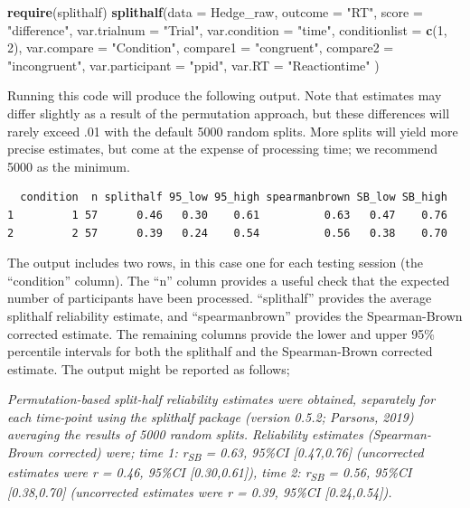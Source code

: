\documentclass[english,,man,floatsintext]{apa6}
\newenvironment{Shaded}{\begin{snugshade}}{\end{snugshade}}
\newcommand{\DataTypeTok}[1]{\textcolor[rgb]{0.13,0.29,0.53}{#1}}
\newcommand{\DecValTok}[1]{\textcolor[rgb]{0.00,0.00,0.81}{#1}}
\newcommand{\KeywordTok}[1]{\textcolor[rgb]{0.13,0.29,0.53}{\textbf{#1}}}
\newcommand{\NormalTok}[1]{#1}
\newcommand{\StringTok}[1]{\textcolor[rgb]{0.31,0.60,0.02}{#1}}
\begin{document}
\begin{Shaded}
\begin{Highlighting}[]
\KeywordTok{require}\NormalTok{(splithalf)}
\KeywordTok{splithalf}\NormalTok{(}\DataTypeTok{data =}\NormalTok{ Hedge_raw,}
          \DataTypeTok{outcome =} \StringTok{"RT"}\NormalTok{,}
          \DataTypeTok{score =} \StringTok{"difference"}\NormalTok{,}
          \DataTypeTok{var.trialnum =} \StringTok{"Trial"}\NormalTok{,}
          \DataTypeTok{var.condition =} \StringTok{"time"}\NormalTok{,}
          \DataTypeTok{conditionlist =} \KeywordTok{c}\NormalTok{(}\DecValTok{1}\NormalTok{, }\DecValTok{2}\NormalTok{),}
          \DataTypeTok{var.compare =} \StringTok{"Condition"}\NormalTok{,}
          \DataTypeTok{compare1 =} \StringTok{"congruent"}\NormalTok{,}
          \DataTypeTok{compare2 =} \StringTok{"incongruent"}\NormalTok{,}
          \DataTypeTok{var.participant =} \StringTok{"ppid"}\NormalTok{,}
          \DataTypeTok{var.RT =} \StringTok{"Reactiontime"}\NormalTok{ )}
\end{Highlighting}
\end{Shaded}

Running this code will produce the following output. Note that estimates may differ slightly as a result of the permutation approach, but these differences will rarely exceed .01 with the default 5000 random splits. More splits will yield more precise estimates, but come at the expense of processing time; we recommend 5000 as the minimum.

\begin{verbatim}
  condition  n splithalf 95_low 95_high spearmanbrown SB_low SB_high
1         1 57      0.46   0.30    0.61          0.63   0.47    0.76
2         2 57      0.39   0.24    0.54          0.56   0.38    0.70
\end{verbatim}

The output includes two rows, in this case one for each testing session (the \enquote{condition} column). The \enquote{n} column provides a useful check that the expected number of participants have been processed. \enquote{splithalf} provides the average splithalf reliability estimate, and \enquote{spearmanbrown} provides the Spearman-Brown corrected estimate. The remaining columns provide the lower and upper 95\% percentile intervals for both the splithalf and the Spearman-Brown corrected estimate. The output might be reported as follows;

\emph{Permutation-based split-half reliability estimates were obtained, separately for each time-point using the splithalf package (version 0.5.2; Parsons, 2019) averaging the results of 5000 random splits. Reliability estimates (Spearman-Brown corrected) were; time 1: r\textsubscript{SB} = 0.63, 95\%CI {[}0.47,0.76{]} (uncorrected estimates were r = 0.46, 95\%CI {[}0.30,0.61{]}), time 2: r\textsubscript{SB} = 0.56, 95\%CI {[}0.38,0.70{]} (uncorrected estimates were r = 0.39, 95\%CI {[}0.24,0.54{]}).}
\end{document}
